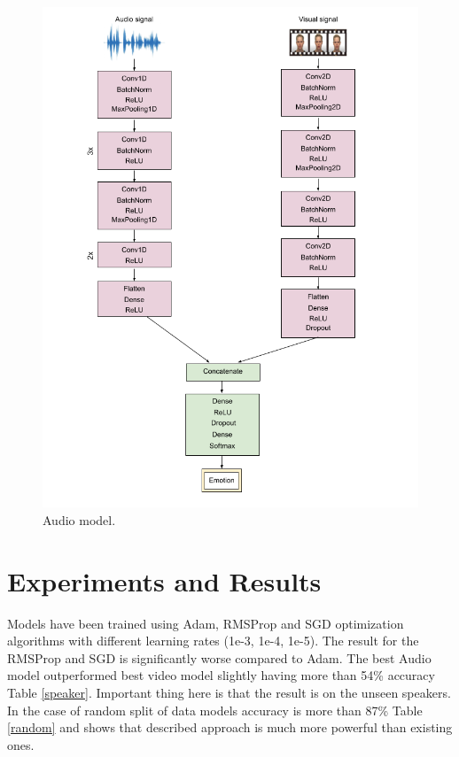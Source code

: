 \documentclass[oneside]{report}
\begin{document}
        \begin{figure}[H]
        \centering
        \includegraphics[scale=0.6]{Video.png}
        \caption{Audio model.}
        \label{fig:video}
        \end{figure}

    

\chapter{Experiments and Results}

    Models have been trained using Adam, RMSProp and SGD optimization algorithms with different learning rates (1e-3, 1e-4, 1e-5). The result for the RMSProp and SGD is significantly worse compared to Adam. The best Audio model outperformed \cite{stanford_2020} best video model slightly having more than 54\% accuracy Table \ref{speaker}. Important thing here is that the result is on the unseen speakers. In the case of random split of data models accuracy is more than 87\% Table \ref{random} and shows that described approach is much more powerful than existing ones. 
    
\end{document}
